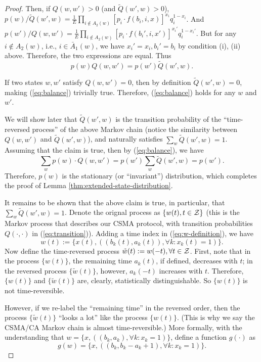 \documentclass{IEEEtran}
\begin{document}
\begin{proof}
Then, if $Q(w,w')>0$ (and $\tilde{Q}(w',w)>0$), $p(w)/\tilde{Q}(w',w)=\frac{1}{E}\prod_{i\notin A_{2}(w)}[p_{i}\cdot f(b_{i},i,x)]^{x_{i}}q_{i}^{1-x_{i}}$.
And $p(w')/Q(w,w')=\frac{1}{E}\prod_{i\notin A_{2}(w)}[p_{i}\cdot f(b_{i}',i,x')]^{x_{i}'}q_{i}^{1-x_{i}'}$.
But for any $i\notin A_{2}(w)$, i.e., $i\in\bar{A}_{1}(w)$, we have
$x_{i}'=x_{i},b_{i}'=b_{i}$ by condition (i), (ii) above. Therefore,
the two expressions are equal. Thus\begin{equation}
p(w)Q(w,w')=p(w')\tilde{Q}(w',w).\label{eq:balance}\end{equation}


If two states $w,w'$ satisfy $Q(w,w')=0$, then by definition $\tilde{Q}(w',w)=0$,
making (\ref{eq:balance}) trivially true. Therefore, (\ref{eq:balance})
holds for any $w$ and $w'$.

We will show later that $\tilde{Q}(w',w)$ is the transition probability
of the {}``time-reversed process'' of the above Markov chain (notice
the similarity between $Q(w,w')$ and $\tilde{Q}(w',w)$), and naturally
satisfies $\sum_{w}\tilde{Q}(w',w)=1$. Assuming that the claim is
true, then by (\ref{eq:balance}), we have \[
\sum_{w}p(w)\cdot Q(w,w')=p(w')\sum_{w}\tilde{Q}(w',w)=p(w').\]
Therefore, $p(w)$ is the stationary (or {}``invariant'') distribution,
which completes the proof of Lemma \ref{thm:extended-state-distribution}.

It remains to be shown that the above claim is true, in particular,
that $\sum_{w}\tilde{Q}(w',w)=1$. Denote the orignal process as $\{w(t),t\in{\cal Z}\}$
(this is the Markov process that describes our CSMA protocol, with
transition probabilities $Q(\cdot,\cdot)$ in (\ref{eq:transition})).
Adding a time index in (\ref{eq:w-definition}), we have \begin{equation}
w(t):=\{x(t),((b_{k}(t),a_{k}(t)),\forall k:x_{k}(t)=1)\}.\label{eq:w-time}\end{equation}
Now define the time-reversed process $\tilde{w}(t):=w(-t),\forall t\in{\cal Z}$.
First, note that in the process $\{w(t)\}$, the remaining time $a_{k}(t)$,
if defined, decreases with $t$; in the reversed process $\{\tilde{w}(t)\}$,
however, $a_{k}(-t)$ increases with $t$. Therefore, $\{w(t)\}$
and $\{\tilde{w}(t)\}$ are, clearly, statistically distinguishable.
So $\{w(t)\}$ is not time-reversible.

However, if we re-label the {}``remaining time'' in the reversed
order, then the process $\{\tilde{w}(t)\}$ {}``looks a lot'' like
the process $\{w(t)\}$. (This is why we say the CSMA/CA Markov chain
is almost time-reversible.) More formally, with the understanding
that $w=\{x,((b_{k},a_{k}),\forall k:x_{k}=1)\}$, define a function
$g(\cdot)$ as \begin{equation}
g(w)=\{x,((b_{k},b_{k}-a_{k}+1),\forall k:x_{k}=1)\}.\label{eq:func_g}\end{equation}



\end{proof}
\end{document}
